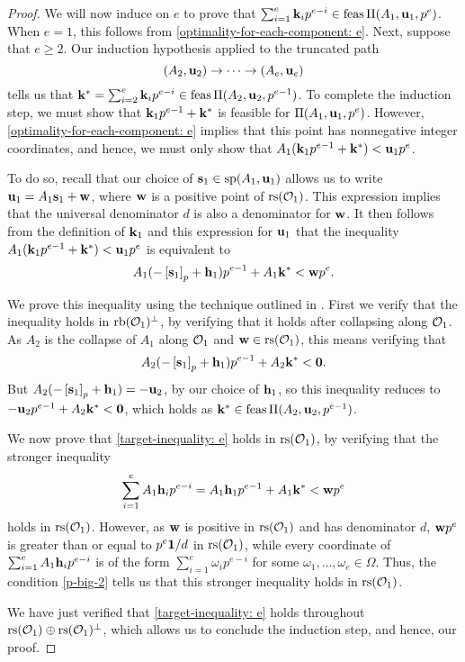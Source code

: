 \documentclass[11pt]{amsart}
\newcommand{\denom}{d}
\begin{document}
\begin{proof}
    We will now induce on $e$ to prove that $\sum_{i=1}^e \mathbf{k}_i p^{e-i} \in \operatorname{feas}\Pi(A_1, \mathbf{u}_1, p^e)$.
    When $e = 1$, this follows from \eqref{optimality-for-each-component: e}.
    Next, suppose that $e \geq 2$.
    Our induction hypothesis applied to the truncated path
    \[ (A_2, \mathbf{u}_2) \to \cdots \to (A_e, \mathbf{u}_e) \]
    tells us that $\mathbf{k}^{\ast} = \sum_{i=2}^e \mathbf{k}_i p^{e-i} \in \operatorname{feas} \Pi(A_2, \mathbf{u}_2, p^{e-1})$.
    To complete the induction step, we must show that $\mathbf{k}_1 p^{e-1} + \mathbf{k}^{\ast}$ is feasible for $\Pi(A_1, \mathbf{u}_1, p^e)$.
    However, \eqref{optimality-for-each-component: e} implies that this point has nonnegative integer coordinates, and hence, we must only show that $A_1 ( \mathbf{k}_1 p^{e-1} + \mathbf{k}^{\ast} ) < \mathbf{u}_1 p^e$.

    To do so, recall that our choice of $\mathbf{s}_1 \in \operatorname{sp}(A_1, \mathbf{u}_1)$ allows us to write $\mathbf{u}_1 = A_1 \mathbf{s}_1 + \mathbf{w}$, where $\mathbf{w}$ is a positive point of $\operatorname{rs}(\mathcal{O}_1)$.
    This expression implies that the universal denominator $\denom$ is also a denominator for $\mathbf{w}$.
    It then follows from the definition of $\mathbf{k}_1$ and this expression for $\mathbf{u}_1$ that the inequality $A_1 ( \mathbf{k}_1 p^{e-1} + \mathbf{k}^{\ast} ) < \mathbf{u}_1 p^e$ is equivalent to
    \begin{equation}
       \label{target-inequality: e}
       A_1( - \left[ \mathbf{s}_1 \right]_p + \mathbf{h}_1 ) p^{e-1} + A_1\mathbf{k}^{\ast} < \mathbf{w} p^e.
    \end{equation}
    
    We prove this inequality using the technique outlined in .
    First we verify that the inequality holds in $\operatorname{rb}(\mathcal{O}_1)^{\perp}$, by verifying that it holds after collapsing along $\mathcal{O}_1$.
    As $A_2$ is the collapse of $A_1$ along $\mathcal{O}_1$ and $\mathbf{w}\in \operatorname{rs}(\mathcal{O}_1)$, this means verifying that
    \[A_2( - \left[ \mathbf{s}_1 \right]_p + \mathbf{h}_1 ) p^{e-1} + A_2\mathbf{k}^{\ast} < \mathbf{0}.\]
    But $A_2( - \left[ \mathbf{s}_1 \right]_p + \mathbf{h}_1 ) = -\mathbf{u}_2$, by our choice of $\mathbf{h}_1$, so this inequality reduces to $-\mathbf{u}_2 p^{e-1} + A_2 \mathbf{k}^{\ast} < \mathbf{0}$, which holds as $\mathbf{k}^{\ast} \in \operatorname{feas} \Pi(A_2, \mathbf{u}_2, p^{e-1})$.

    We now prove that \eqref{target-inequality: e} holds in $\operatorname{rs}(\mathcal{O}_1)$, by verifying that the stronger inequality
    \[ \sum_{i=1}^{e} A_1 \mathbf{h}_i p^{e-i} = A_1 \mathbf{h}_1 p^{e-1} + A_1 \mathbf{k}^{\ast} < \mathbf{w}p^e \]
    holds in $\operatorname{rs}(\mathcal{O}_1)$.
    However, as $\mathbf{w}$ is positive in $\operatorname{rs}(\mathcal{O}_1)$ and has denominator $\denom$, $\mathbf{w} p^e$ is greater than or equal to $p^e \vv{1} / \denom$ in $\operatorname{rs}(\mathcal{O}_1)$, while every coordinate of $\sum_{i=1}^{e} A_1 \mathbf{h}_i p^{e-i}$ is of the form $\sum_{i=1}^{e} \omega_i  p^{e-i}$ for some $\omega_1, \ldots, \omega_e \in \Omega$.
    Thus, the condition \eqref{p-big-2} tells us that this stronger inequality holds in $\operatorname{rs}(\mathcal{O}_1)$.

    We have just verified that \eqref{target-inequality: e} holds throughout $\operatorname{rs}(\mathcal{O}_1) \oplus \operatorname{rs}(\mathcal{O}_1)^{\perp}$, which allows us to conclude the induction step, and hence, our proof.
\end{proof}
\end{document}
